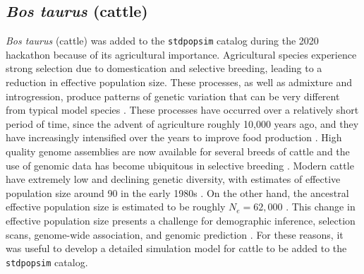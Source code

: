 \documentclass[hidelinks]{article}
\newcommand{\stdpopsim}{\texttt{stdpopsim}\xspace}
\begin{document}
\subsection*{\texorpdfstring{\emph{Bos taurus} (cattle)}{Bos taurus (cattle)}}
    \label{bos-taurus}

\emph{Bos taurus} (cattle) was added to the \stdpopsim catalog during the 2020 hackathon because of its agricultural importance. Agricultural species experience
strong selection due to domestication and selective breeding, leading
to a reduction in effective population size. These processes,
as well as admixture and introgression, produce patterns
of genetic variation that can be very different from typical model
species \citep{Larson2013}. These processes have occurred over a
relatively short period of time, since the advent of agriculture roughly 10,000 years ago, and they have increasingly intensified over the years to improve food production \citep{Gaut2018,MacLeod2013}. High quality genome assemblies are now
available for several breeds of cattle \citep[e.g.,][]{Rosen2020, Heaton2021,
Talenti2022} and the use of genomic data has become ubiquitous
in selective breeding \citep{Meuwissen2001,MacLeod2014, Obsteter2021, Cesarani2022}.
Modern cattle have extremely low and declining genetic diversity,
with estimates of effective population size around 90 in the early 1980s \citep{MacLeod2013, VanRaden2020, Makanjouloa2020}.
On the other hand, the ancestral effective population size is estimated to be roughly $N_e=62,000$ \citep{MacLeod2013}.
This change in effective population size presents a challenge for demographic inference, 
selection scans, genome-wide association, and genomic prediction
\citep{MacLeod2013,MacLeod2014,Hartfield2022}. 
For these reasons, it was useful to develop a detailed simulation model for cattle to be added to the \stdpopsim catalog.
\end{document}
